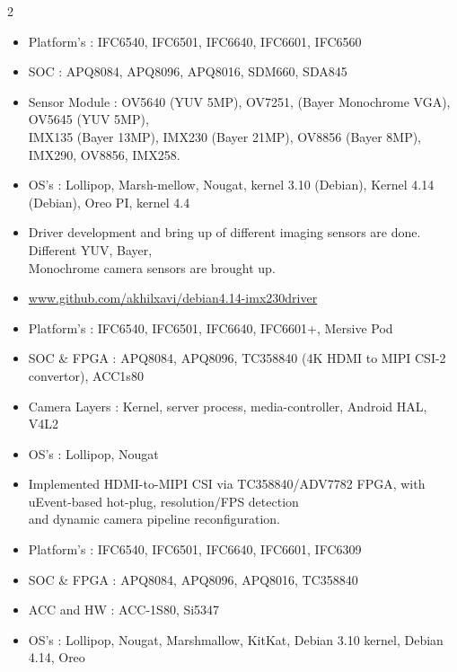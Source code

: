 \documentclass[10pt,a4paper,ragged2e,withhyper]{altacv}
\begin{document}
\begin{paracol}{2}
\begin{itemize}
    \item Platform’s : IFC6540, IFC6501, IFC6640, IFC6601, IFC6560
    \item SOC : APQ8084, APQ8096, APQ8016, SDM660, SDA845
    \item Sensor Module : OV5640 (YUV 5MP), OV7251, (Bayer Monochrome VGA), OV5645 (YUV 5MP), \\
                          IMX135 (Bayer 13MP), IMX230 (Bayer 21MP), OV8856 (Bayer 8MP), IMX290, OV8856, IMX258.
    \item OS’s : Lollipop, Marsh-mellow, Nougat, kernel 3.10 (Debian), Kernel 4.14 (Debian), Oreo PI, kernel 4.4
    \item Driver development and bring up of different imaging sensors are done. Different YUV, Bayer, \\
          Monochrome camera sensors are brought up.
    \item \href{www.github.com/akhilxavi/debian4.14-imx230driver}{www.github.com/akhilxavi/debian4.14-imx230driver}
\end{itemize}

\begin{itemize}
    \item Platform’s : IFC6540, IFC6501, IFC6640, IFC6601+, Mersive Pod
    \item SOC \& FPGA : APQ8084, APQ8096, TC358840 (4K HDMI to MIPI CSI-2 convertor), ACC1s80
    \item Camera Layers : Kernel, server process, media-controller, Android HAL, V4L2
    \item OS’s : Lollipop, Nougat
    \item Implemented HDMI-to-MIPI CSI via TC358840/ADV7782 FPGA, with uEvent-based hot-plug, resolution/FPS detection \\
          and dynamic camera pipeline reconfiguration.
\end{itemize}

\begin{itemize}
    \item Platform’s : IFC6540, IFC6501, IFC6640, IFC6601, IFC6309
    \item SOC \& FPGA : APQ8084, APQ8096, APQ8016, TC358840
    \item ACC and HW : ACC-1S80, Si5347
    \item OS’s : Lollipop, Nougat, Marshmallow, KitKat, Debian 3.10 kernel, Debian 4.14, Oreo


\end{itemize}
\end{paracol}
\end{document}
